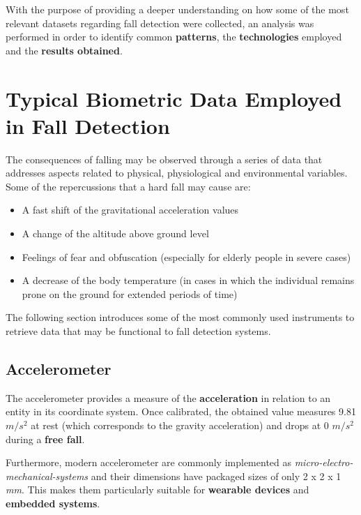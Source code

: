 \label{ch:fall-detection}

With the purpose of providing a deeper understanding on how some of the most relevant datasets regarding fall detection were collected, an analysis was performed in order to identify common \textbf{patterns}, the \textbf{technologies} employed and the \textbf{results obtained}. 

\section{Typical Biometric Data Employed in Fall Detection}\label{sec:hardware}

The consequences of falling may be observed through a series of data that addresses aspects related to physical, physiological and environmental variables. Some of the repercussions that a hard fall may cause are:

\begin{itemize}
    \item A fast shift of the gravitational acceleration values
    \item A change of the altitude above ground level
    \item Feelings of fear and obfuscation (especially for elderly people in severe cases)
    \item A decrease of the body temperature (in cases in which the individual remains prone on the ground for extended periods of time)
\end{itemize}

The following section introduces some of the most commonly used instruments to retrieve data that may be functional to fall detection systems.

\subsection{Accelerometer}\label{subsec:accelerometer}

The accelerometer provides a measure of the \textbf{acceleration} in relation to an entity in its coordinate system. Once calibrated, the obtained value measures 9.81 $m/s^2$ at rest (which corresponds to the gravity acceleration) and drops at 0 $m/s^2$ during a \textbf{free fall}.

Furthermore, modern accelerometer are commonly implemented as \emph{micro-electro-mechanical-systems} and their dimensions have packaged sizes of only 2 x 2 x 1 \textit{mm}. This makes them particularly suitable for \textbf{wearable devices} and \textbf{embedded systems}.

